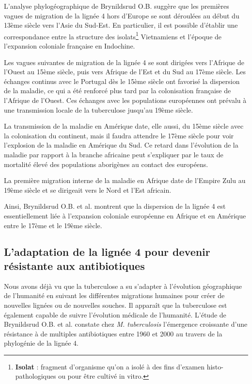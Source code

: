 \documentclass[twoside,a4paper,11pt,frenchb,openany]{report}
\begin{document}

L'analyse phylogéographique de Brynildsrud O.B. suggère que les premières vagues de migration de la lignée 4 hors d'Europe se sont déroulées au début du 13ème siècle vers l'Asie du Sud-Est. En particulier, il est possible d'établir une correspondance entre la structure des isolats\footnote{\textbf{Isolat} : fragment d'organisme qu'on a isolé à des fins d'examen histo-pathologiques ou pour être cultivé in vitro.} Vietnamiens et l'époque de l'expansion coloniale française en Indochine.

Les vagues suivantes de migration de la lignée 4 se sont dirigées vers l'Afrique de l'Ouest au 15ème siècle, puis vers Afrique de l'Est et du Sud au 17ème siècle. Les échanges continus avec le Portugal dès le 15ème siècle ont favorisé la dispersion de la maladie, ce qui a été renforcé plus tard par la colonisation française de l'Afrique de l'Ouest.  Ces échanges avec les populations européennes ont prévalu à une transmission locale de la tuberculose jusqu'au 19ème siècle. 

La transmission de la maladie en Amérique date, elle aussi, du 15ème siècle avec la colonisation du continent, mais il faudra attendre le 17ème siècle pour voir l'explosion de la maladie en Amérique du Sud. Ce retard dans l'évolution de la maladie par rapport à la branche africaine peut s'expliquer par le taux de mortalité élevé des populations aborigènes au contact des européens.

La première migration interne de la maladie en Afrique date de l'Empire Zulu au 19ème siècle et se dirigeait vers le Nord et l'Est africain.

Ainsi, Brynildsrud O.B. et al. montrent que la dispersion de la lignée 4 est essentiellement liée à l'expansion coloniale européenne en Afrique et en Amérique entre le 17ème et le 19ème siècle.


\subsection{L'adaptation de la lignée 4 pour devenir résistante aux antibiotiques}

Nous avons déjà vu que la tuberculose a su s'adapter à l'évolution géographique de l'humanité en suivant les différentes migrations humaines pour créer de nouvelles lignées ou de nouvelles souches. Il apparaît que la tuberculose est également capable de suivre l'évolution médicale de l'humanité. L'étude de Brynildsrud O.B. et al.\cite{brynildsrud} constate chez \textit{M. tuberculosis} l'émergence croissante d'une résistance à de multiples antibiotiques entre 1960 et 2000 au travers de la phylogénie de la lignée 4.
\end{document}
